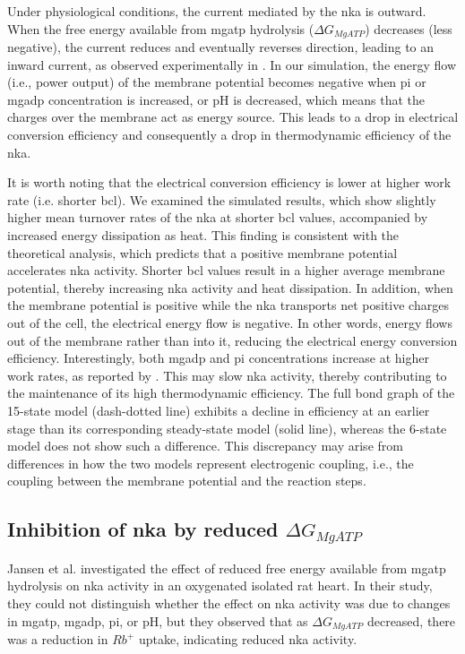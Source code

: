 \documentclass{biophys-new}
\newcommand{\rev}[1]{{\color{black} #1}}
\begin{document}
Under physiological conditions, the current mediated by the \gls{nka} is outward.
When the free energy available from \gls{mgatp} hydrolysis ($\Delta G_{MgATP}$) decreases (less negative), the current reduces and eventually reverses direction, leading to an inward current, as observed experimentally in \cite{glitsch_change_1995}.
In our simulation, the energy flow (i.e., power output) of the membrane potential becomes negative when \gls{pi} or \gls{mgadp} concentration is increased, or pH is decreased,
which means that the charges over the membrane act as energy source.
This leads to a drop in electrical conversion efficiency and consequently a drop in thermodynamic efficiency of the \gls{nka}.

It is worth noting that the electrical conversion efficiency is lower at higher work rate (i.e. shorter \gls{bcl}). \rev{We examined the simulated results, which show slightly higher mean turnover rates of the \gls{nka} at shorter \gls{bcl} values, accompanied by increased energy dissipation as heat. This finding is consistent with the theoretical analysis, which predicts that a positive membrane potential accelerates \gls{nka} activity. Shorter \gls{bcl} values result in a higher average membrane potential, thereby increasing \gls{nka} activity and heat dissipation. In addition, when the membrane potential is positive while the \gls{nka} transports net positive charges out of the cell, the electrical energy flow is negative. In other words, energy flows out of the membrane rather than into it, reducing the electrical energy conversion efficiency. Interestingly, both \gls{mgadp} and \gls{pi} concentrations increase at higher work rates, as reported by \cite{wu_phosphate_2008}. This may slow \gls{nka} activity, thereby contributing to the maintenance of its high thermodynamic efficiency. The full bond graph of the 15-state model \rev{(dash-dotted line)} exhibits a decline in efficiency at an earlier stage than its corresponding steady-state model \rev{(solid line)}, whereas the 6-state model does not show such a difference. This discrepancy may arise from differences in how the two models represent electrogenic coupling, i.e., the coupling between the membrane potential and the reaction steps.}

\subsection*{Inhibition of \Gls{nka} by reduced \texorpdfstring{$\Delta G_{MgATP}$}{Lg}}

Jansen et al. \cite{jansen2003energy} investigated the effect of reduced free energy available from \gls{mgatp} hydrolysis on \gls{nka} activity in an oxygenated isolated rat heart. 
In their study, they could not distinguish whether the effect on \gls{nka} activity was due to changes in \gls{mgatp}, \gls{mgadp}, \gls{pi}, or pH, but they observed that as $\Delta G_{MgATP}$ decreased, there was a reduction in $Rb^+$ uptake, indicating reduced \gls{nka} activity.
\end{document}
